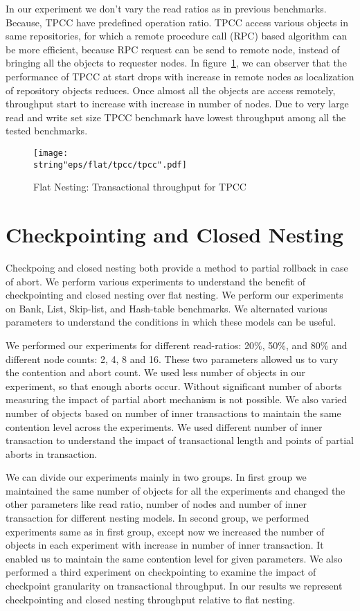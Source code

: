 \documentclass[12pt,english]{report}
\begin{document}
In our experiment we don't vary the read ratios as in previous benchmarks. Because, TPCC have predefined operation ratio. TPCC access various objects in same repositories, for which a remote procedure call (RPC) based algorithm can be more efficient, because RPC request can be send to remote node, instead of bringing all the objects to requester nodes. In figure~\ref{Fig:flatTPCC}, we can observer that the performance of TPCC at start drops with increase in remote nodes as localization of repository objects reduces. Once almost all the objects are access remotely, throughput start to increase with increase in number of nodes. Due to very large read and write set size TPCC benchmark have lowest throughput among all the tested benchmarks.

\begin{figure}[H]
\centering
\texttt{[image: \\string"eps/flat/tpcc/tpcc".pdf]}
\caption{Flat Nesting: Transactional throughput for TPCC}
\label{Fig:flatTPCC}
\end{figure}

\section{Checkpointing and Closed Nesting}

Checkpoing and closed nesting both provide a method to partial rollback in case of abort. We perform various experiments to understand the benefit of checkpointing and closed nesting over flat nesting. We perform our experiments on Bank, List, Skip-list, and Hash-table benchmarks. We alternated various parameters to understand the conditions in which these models can be useful.

We performed our experiments for different read-ratios: 20\%, 50\%, and 80\% and different node counts: 2, 4, 8 and 16. These two parameters allowed us to vary the contention and abort count. We used less number of objects in our experiment, so that enough aborts occur. Without significant number of aborts measuring the impact of partial abort mechanism is not possible. We also varied number of objects based on number of inner transactions to maintain the same contention level across the experiments. We used different number of inner transaction to understand the impact of transactional length and points of partial aborts in transaction.

We can divide our experiments mainly in two groups. In first group we maintained the same number of objects for all the experiments and changed the other parameters like read ratio, number of nodes and number of inner transaction for different nesting models. In second group, we performed experiments same as in first group, except now we increased the number of objects in each experiment with increase in number of inner transaction. It enabled us to maintain the same contention level for given parameters. We also performed a third experiment on checkpointing to examine the impact of checkpoint granularity on transactional throughput. In our results we represent checkpointing and closed nesting throughput relative to flat nesting.
\end{document}
